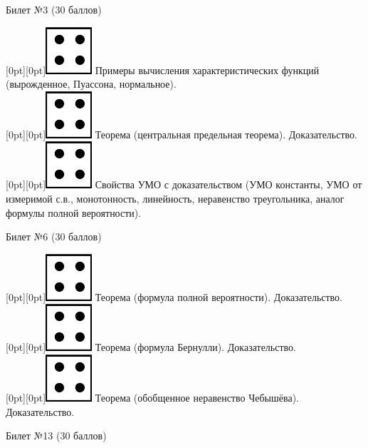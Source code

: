 \documentclass[10pt]{article}
\begin{document}
\begin{center} {\Large Билет №3 (30 баллов)} \end{center}

\raisebox{-1pt}[0pt][0pt]{\includegraphics[width=0.02\linewidth]{4.png}} Примеры вычисления характеристических функций (вырожденное, Пуассона, нормальное). \\

\raisebox{-1pt}[0pt][0pt]{\includegraphics[width=0.02\linewidth]{4.png}} Теорема (центральная предельная теорема). Доказательство. \\        

\raisebox{-1pt}[0pt][0pt]{\includegraphics[width=0.02\linewidth]{4.png}} Свойства УМО с доказательством (УМО константы, УМО от измеримой с.в., монотонность,  линейность, неравенство треугольника,  аналог формулы полной вероятности). \\

\begin{center} {\Large Билет №6 (30 баллов)} \end{center}

\raisebox{-1pt}[0pt][0pt]{\includegraphics[width=0.02\linewidth]{4.png}} Теорема (формула полной вероятности). Доказательство. \\

\raisebox{-1pt}[0pt][0pt]{\includegraphics[width=0.02\linewidth]{4.png}} Теорема (формула Бернулли). Доказательство. \\

\raisebox{-1pt}[0pt][0pt]{\includegraphics[width=0.02\linewidth]{4.png}} Теорема (обобщенное неравенство Чебышёва). Доказательство. \\

\begin{center} {\Large Билет №13 (30 баллов)} \end{center}
\end{document}
